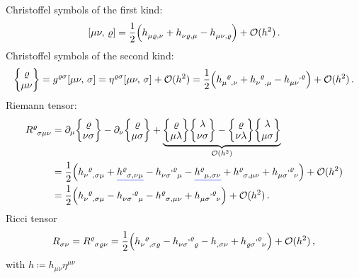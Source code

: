 Christoffel symbols of the first kind:
\begin{equation}
    \csym{\mu}{\nu}{\varrho} = \frac{1}{2} \left( \tensor{h}{_\mu_\varrho_,_\nu} + \tensor{h}{_\nu_\varrho_,_\mu}
    - \tensor{h}{_\mu_\nu_,_\varrho} \right) + \landauO(h^2) \, .
\end{equation}
Christoffel symbols of the second kind:
\begin{equation}
    \cSym{\varrho}{\mu}{\nu} = g^{\varrho\sigma} \csym{\mu}{\nu}{\sigma} = \eta^{\varrho\sigma} \csym{\mu}{\nu}{\sigma} + \landauO(h^2)
    = \frac{1}{2} \left( \tensor{h}{_\mu^\varrho_,_\nu} + \tensor{h}{_\nu^\varrho_,_\mu} - \tensor{h}{_\mu_\nu^,^\varrho} \right) + \landauO(h^2) \, .
\end{equation}
Riemann tensor:
\begin{equation}
    \begin{split}
        \tensor{R}{^\varrho_\sigma_\mu_\nu}
        &= \partial_\mu \cSym{\varrho}{\nu}{\sigma} - \partial_\nu \cSym{\varrho}{\mu}{\sigma}
        + \underbrace{\cSym{\varrho}{\mu}{\lambda} \cSym{\lambda}{\nu}{\sigma} - \cSym{\varrho}{\nu}{\lambda} \cSym{\lambda}{\mu}{\sigma}}_{\landauO(h^2)} \\
        &= \frac{1}{2} \left( \tensor{h}{_\nu^\varrho_,_\sigma_\mu} + \mathunderline{blue}{\tensor{h}{^\varrho_\sigma_,_\nu_\mu}} - \tensor{h}{_\nu_\sigma^,^\varrho_\mu}
        - \mathunderline{blue}{\tensor{h}{^\varrho_\mu_,_\sigma_\nu}} + \tensor{h}{^\varrho_\sigma_,_\mu_\nu} + \tensor{h}{_\mu_\sigma^,^\varrho_\nu} \right) + \landauO(h^2) \\
        &= \frac{1}{2} \left( \tensor{h}{_\nu^\varrho_,_\sigma_\mu} - \tensor{h}{_\nu_\sigma^,^\varrho_\mu}
        - \tensor{h}{^\varrho_\sigma_,_\mu_\nu} + \tensor{h}{_\mu_\sigma^,^\varrho_\nu} \right) + \landauO(h^2) \, .
    \end{split}
\end{equation}
Ricci tensor
\begin{equation}
    \tensor{R}{_\sigma_\nu} = \tensor{R}{^\varrho_\sigma_\varrho_\nu}
    = \frac{1}{2} \left( \tensor{h}{_\nu^\varrho_,_\sigma_\varrho} - \tensor{h}{_\nu_\sigma^,^\varrho_\varrho}
    - \tensor{h}{_,_\sigma_\nu} + \tensor{h}{_\varrho_\sigma^,^\varrho_\nu} \right) + \landauO(h^2)\, ,
\end{equation}
with $h\coloneqq h_{\mu\nu}\eta^{\mu\nu}$

